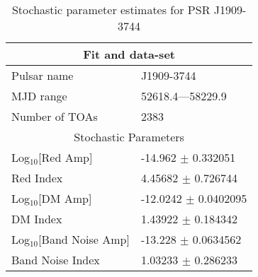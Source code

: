 \documentclass{article}
\begin{document}
\begin{table*}
\caption{Stochastic parameter estimates for PSR J1909-3744}
\begin{tabular}{ll}
\hline\hline
\multicolumn{2}{c}{Fit and data-set} \\ 
\hline
Pulsar name\dotfill & J1909-3744 \\ 
MJD range\dotfill & 52618.4---58229.9 \\ 
Number of TOAs\dotfill & 2383 \\
\hline
\multicolumn{2}{c}{Stochastic Parameters} \\ 
\hline
Log$_{10}$[Red Amp] \dotfill & -14.962 $\pm$ 0.332051  \\ 
Red Index \dotfill & 4.45682 $\pm$ 0.726744  \\ 
Log$_{10}$[DM Amp] \dotfill & -12.0242 $\pm$ 0.0402095  \\ 
DM Index \dotfill & 1.43922 $\pm$ 0.184342  \\ 
Log$_{10}$[Band Noise Amp] \dotfill & -13.228 $\pm$ 0.0634562  \\ 
Band Noise Index \dotfill & 1.03233 $\pm$ 0.286233  \\ 
\hline
\end{tabular}
\label{Table:J1909-3744}
\end{table*} 
\end{document}
